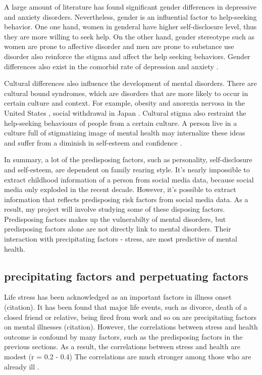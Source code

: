 A large amount of literature has found significant gender differences in depressive and anxiety disorders. Nevertheless, gender is an influential factor to help-seeking behavior. One one hand, women in genderal have higher self-disclosure level, thus they are more willing to seek help. On the other hand, gender stereotype such as women are prone to affective disorder and men are prone to substance use disorder also reinforce the stigma and affect the help seeking behaviors. Gender differences also exist in the comorbid rate of depression and anxiety \cite{afifi2007gender}. 

Cultural differences also influence the development of mental disorders. There are cultural bound syndromes, which are disorders that are more likely to occur in certain culture and context. For example, obesity and anorexia nervosa in the United States \cite{ritenbaugh1982obesity}, social withdrawal in Japan \cite{teo2010hikikomori}. Cultural stigma also restraint the help-seeking behaviours of people from a certain culture. A person live in a culture full of stigmatizing image of mental health may internalize these ideas and suffer from a diminish in self-esteem and confidence \cite{corrigan1998impact,holmes1998individual}. 

In summary, a lot of the predisposing factors, such as personality, self-disclosure and self-esteem, are dependent on family rearing style. It's nearly impossible to extract childhood information of a person from social media data, because social media only exploded in the recent decade. However, it's possible to extract information that reflects predisposing risk factors from social media data. As a result, my project will involve studying some of these disposing factors. Predisposing factors makes up the vulnerabilty of mental disorders, but predisposing factors alone are not directly link to mental disorders. Their interaction with precipitating factors - stress, are most predictive of mental health.


\subsection{precipitating factors and perpetuating factors}

Life stress has been acknowledged as an important factors in illness onset (citation). It has been found that major life events, such as divorce, death of a closed friend or relative, being fired from work and so on are precipitating factors on mental illnesses (citation). However, the correlations between stress and health outcome is confound by many factors, such as the predisposing factors in the previous sections. As a result, the correlations between stress and health are modest (r =  0.2 - 0.4)  The correlations are much stronger among those who are already ill \cite{aldwin2004interface}.

